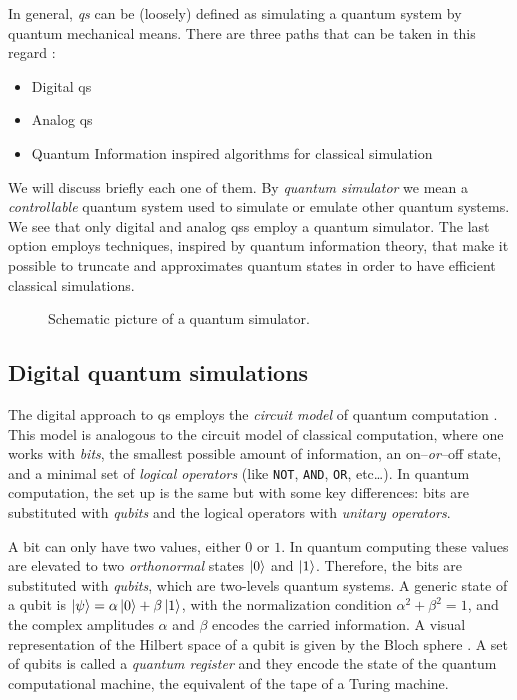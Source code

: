 In general, \emph{\acf{qs}} can be (loosely) defined as simulating a quantum system by quantum mechanical means.
There are three paths that can be taken in this regard \cite{georgescu2014simulation}:
\begin{itemize}
    \item Digital \acl{qs}
    \item Analog \acl{qs}
    \item Quantum Information inspired algorithms for classical simulation
\end{itemize}
We will discuss briefly each one of them.
By \emph{quantum simulator} we mean a \emph{controllable} quantum system used to simulate or emulate other quantum systems.
We see that only digital and analog \ac{qs}s employ a quantum simulator.
The last option employs techniques, inspired by quantum information theory, that make it possible to truncate and approximates quantum states in order to have efficient classical simulations.


\begin{figure}[t]
    \centering
    
    \caption{Schematic picture of a quantum simulator.}
\end{figure}



\subsection{Digital quantum simulations}
\label{sub:digital_quantum_simulations}

The digital approach to \ac{qs} employs the \emph{circuit model} of quantum computation \cite{nielsen2010quantum, deutsch1989quantum}.
This model is analogous to the circuit model of classical computation, where one works with \emph{bits}, the smallest possible amount of information, an on--\emph{or}--off state, and a minimal set of \emph{logical operators} (like \texttt{NOT}, \texttt{AND}, \texttt{OR}, etc\dots).
In quantum computation, the set up is the same but with some key differences:
bits are substituted with \emph{qubits} and the logical operators with \emph{unitary operators}.

A bit can only have two values, either $0$ or $1$.
In quantum computing these values are elevated to two \emph{orthonormal} states $\ket{0}$ and $\ket{1}$.
Therefore, the bits are substituted with \emph{qubits}, which are two-levels quantum systems.
A generic state of a qubit is $\ket{\psi} = \alpha \ket{0} + \beta \ket{1}$, with the normalization condition $\alpha^2 + \beta^2 = 1$, and the complex amplitudes $\alpha$ and $\beta$ encodes the carried information.
A visual representation of the Hilbert space of a qubit is given by the Bloch sphere .
A set of qubits is called a \emph{quantum register} and they encode the state of the quantum computational machine, the equivalent of the tape of a Turing machine.

